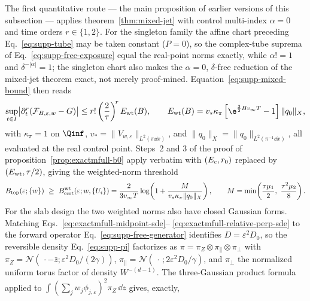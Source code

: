 \begin{remark}
\label{rem:exactmfull-b0-baseline}
The first quantitative route --- the main proposition of earlier versions
of this subsection --- applies theorem~\ref{thm:mixed-jet} with control
multi-index \(\alpha=0\) and time orders \(r\in\{1,2\}\).  For the
singleton family the affine chart preceding Eq.~\eqref{eq:supp-tube} may be
taken constant (\(P=0\)), so the complex-tube suprema of
Eq.~\eqref{eq:supp-free-exposure} equal the real-point norms exactly, while
\(\alpha!=1\) and \(\delta^{-|\alpha|}=1\); the singleton chart also makes
the \(\alpha=0\), \(\delta\)-free reduction of the mixed-jet theorem
exact, not merely proof-mined.  Equation~\eqref{eq:supp-mixed-bound} then
reads
\begin{equation}
 \sup_{t\in I}
 \bigl|\partial_t^r(\mathcal F_{B,\varepsilon,w}-G)\bigr|
 \le r!\left(\frac2\tau\right)^{\!r}E_{\rm wt}(B),
 \qquad
 E_{\rm wt}(B)=v_*\kappa_\pi
 \left[\e^{\frac32Bv_\infty T}-1\right]\|q_0\|_X,
 \label{eq:exactmfull-b0-baseline-jet}
\end{equation}
with \(\kappa_\pi=1\) on \(\Qinf\),
\(v_*=\|V_{w,\varepsilon}\|_{L^2(\pi\dd x)}\), and
\(\|q_0\|_X=\|q_0\|_{L^2(\pi^{-1}\dd x)}\), all evaluated at the real
control point.  Steps~2 and 3 of the proof of
proposition~\ref{prop:exactmfull-b0} apply verbatim with
\((E_{\rm c},r_0)\) replaced by \((E_{\rm wt},\tau/2)\), giving the
weighted-norm threshold
\begin{equation}
 B_{\rm top}(\varepsilon;\{w\})\ \ge\
 B_{\rm cert}^{\rm wt}(\varepsilon;w,\{U_i\})
 =\frac{2}{3v_\infty T}
  \log\!\left(1+\frac{M}{v_*\kappa_\pi\|q_0\|_X}\right),
 \qquad
 M=\min\!\left(\frac{\tau\mu_1}{2},\ \frac{\tau^2\mu_2}{8}\right).
 \label{eq:exactmfull-b0-baseline-threshold}
\end{equation}
For the slab design the two weighted norms also have closed Gaussian
forms.  Matching Eqs.~\eqref{eq:exactmfull-midpoint-sde}--%
\eqref{eq:exactmfull-relative-perp-sde} to the forward operator
Eq.~\eqref{eq:supp-free-generator} identifies \(D=\varepsilon^2D_0\), so
the reversible density Eq.~\eqref{eq:supp-pi} factorizes as
\(\pi=\pi_Z\otimes\pi_\parallel\otimes\pi_\perp\) with
\(\pi_Z=\mathcal N(\,\cdot-\bar z;\varepsilon^2D_0/(2\gamma))\),
\(\pi_\parallel=\mathcal N(\,\cdot\,;2\varepsilon^2D_0/\gamma)\), and
\(\pi_\perp\) the normalized uniform torus factor of density
\(W^{-(d-1)}\).  The three-Gaussian product formula applied to
\(\int(\sum_jw_j\phi_{j,\varepsilon})^2\pi_Z\,\dd z\) gives, exactly,

\end{remark}

